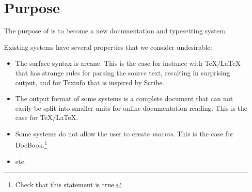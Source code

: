 \chapter{Purpose}
\label{chap-purpose}

The purpose of \sysname{} is to become a new documentation and
typesetting system.

Existing systems have several properties that we consider
undesirable:

\begin{itemize}
\item The surface syntax is arcane.  This is the case for instance
  with TeX/LaTeX that has strange rules for parsing the source text,
  resulting in surprising output, and for Texinfo that is inspired by
  Scribe.
\item The output format of some systems is a complete document that
  can not easily be split into smaller units for online documentation
  reading.  This is the case for TeX/LaTeX.
\item Some systems do not allow the user to create \emph{macros}.
  This is the case for DocBook.\footnote{Check that this statement is
    true.} 
\item etc.
\end{itemize}

